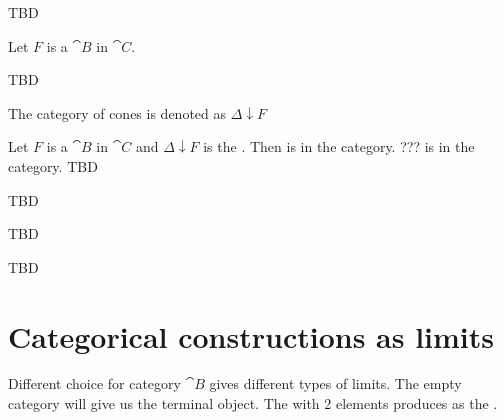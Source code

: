 \begin{definition}
TBD
\end{definition}

\begin{definition}
\label{def:category_of_cones}
Let $F$ is a  $\cat{B}$ in $\cat{C}$.

TBD

The category of cones is denoted as $\Delta \downarrow F$ \cite{wiki:cone}
\end{definition}

\begin{remark}
\label{rem:category_of_cones}
Let $F$ is a  $\cat{B}$ in $\cat{C}$
and $\Delta \downarrow F$ is the .
Then  is  in the
category. ???  is  in the
category. 
TBD
\end{remark}

\begin{definition}[Co-cone]
\label{def:cocone}
TBD
\end{definition}

\begin{definition}[Colimit]
\label{def:colimit}
TBD
\end{definition}


TBD

\section{Categorical constructions as limits}

Different choice for category $\cat{B}$ gives different types of
limits. The empty category will give us the terminal object. The
 with 2 elements produces
 as the .
